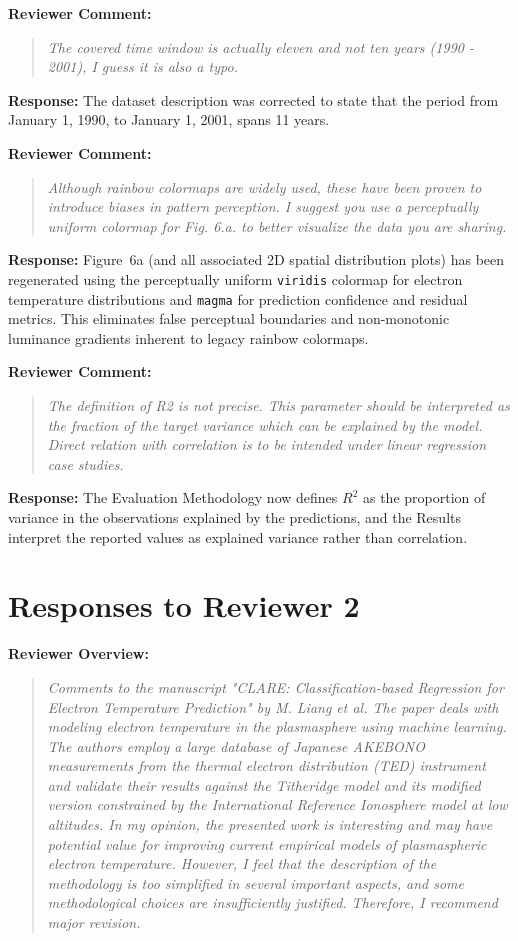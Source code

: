 \documentclass[a4paper,12pt]{article}
\newcommand{\reviewercomment}[1]{%
  \begin{samepage}%
  \par\noindent\textbf{Reviewer Comment:}\par
  \begin{quote}\itshape #1\end{quote}}
\newcommand{\reviewercontext}[1]{%
  \par\noindent\textbf{Reviewer Overview:}\par
  \begin{quote}\itshape #1\end{quote}}
\newcommand{\filledresponse}[1]{%
  \par\noindent\textbf{Response:} #1\par
  \vspace{0.4cm}%
  \end{samepage}}
\begin{document}
\reviewercomment{The covered time window is actually eleven and not ten years (1990 - 2001), I guess it is also a
typo.}
\filledresponse{The dataset description was corrected to state that the period from January 1,
1990, to January 1, 2001, spans 11 years.}

\reviewercomment{Although rainbow colormaps are widely used, these have been proven to introduce biases in pattern
perception. I suggest you use a perceptually uniform colormap for Fig. 6.a. to better visualize the
data you are sharing.}
\filledresponse{Figure~6a (and all associated 2D spatial distribution plots) has been regenerated using the perceptually uniform \texttt{viridis} colormap for electron temperature distributions and \texttt{magma} for prediction confidence and residual metrics. This eliminates false perceptual boundaries and non-monotonic luminance gradients inherent to legacy rainbow colormaps.}

\reviewercomment{The definition of R2 is not precise. This parameter should be interpreted as the fraction of the
target variance which can be explained by the model. Direct relation with correlation is to be
intended under linear regression case studies.}
\filledresponse{The Evaluation Methodology now defines $R^2$ as the proportion of variance in the
observations explained by the predictions, and the Results interpret the reported values as
explained variance rather than correlation.}

\newpage
\section*{Responses to Reviewer 2}

\reviewercontext{Comments to the manuscript "CLARE: Classification-based Regression for Electron Temperature
Prediction" by M. Liang et al. The paper deals with modeling electron temperature in the
plasmasphere using machine learning. The authors employ a large database of Japanese AKEBONO
measurements from the thermal electron distribution (TED) instrument and validate their results
against the Titheridge model and its modified version constrained by the International Reference
Ionosphere model at low altitudes. In my opinion, the presented work is interesting and may have
potential value for improving current empirical models of plasmaspheric electron temperature.
However, I feel that the description of the methodology is too simplified in several important
aspects, and some methodological choices are insufficiently justified. Therefore, I recommend major
revision.}
\end{document}
